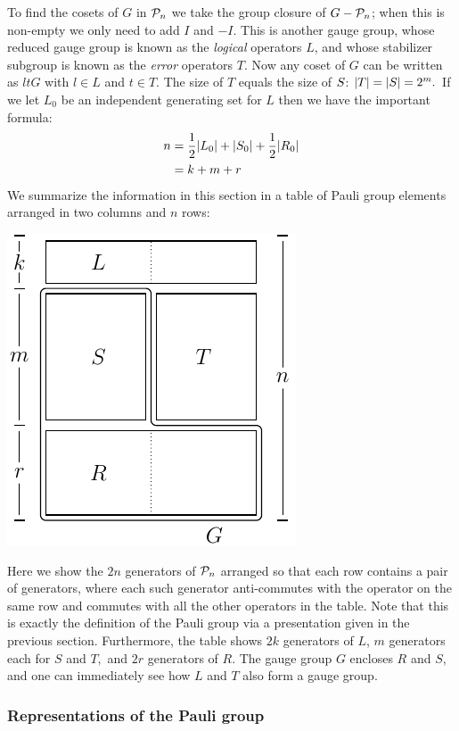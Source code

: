 To find the cosets of $G$ in $\mathcal{P}_n$ we take
the group closure of $G-\mathcal{P}_n$; when this is non-empty
we only need to add $I$ and $-I.$
This is another
gauge group, whose reduced gauge group is known as
the {\it logical} operators $L$, and whose 
stabilizer subgroup is known as the {\it error} operators $T.$
Now any coset of $G$ can be written as $ltG$ with
$l\in L$ and $t\in T.$
The size of $T$ equals the size of $S$: $|T|=|S|=2^m.$
If we let $L_0$ be an independent generating set for $L$
then we have the important formula:
\begin{align}
n &= \frac{1}{2}|L_0| + |S_0| + \frac{1}{2}|R_0|\\
  &= k + m + r
\end{align}
We summarize the information in this section in a table
of Pauli group elements arranged in
two columns and $n$ rows:
\begin{center}
\includegraphics[]{pic-canonical.pdf}
\end{center}
Here we show the $2n$ generators of $\mathcal{P}_n$ arranged 
so that each row contains a pair of generators,
where each such generator anti-commutes with the operator on the same row and
commutes with all the other operators in the table.
Note that this is exactly the definition of the Pauli group
via a presentation given in the previous section.
Furthermore, the table shows $2k$ generators
of $L$, $m$ generators each for $S$ and $T,$ and $2r$
generators of $R.$
The gauge group $G$ encloses $R$ and $S$, and one can
immediately see how $L$ and $T$ also form a gauge group.


\subsubsection{Representations of the Pauli group}

